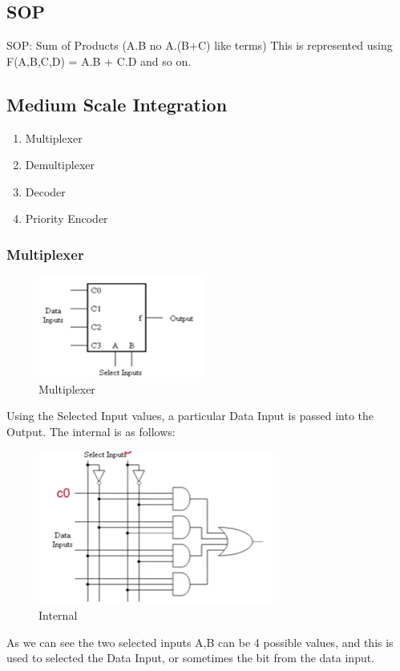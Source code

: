 \documentclass[11pt, a4paper]{article}
\begin{document}
\subsection{SOP}
SOP: Sum of Products (A.B no A.(B+C) like terms)
This is represented using F(A,B,C,D) = A.B + C.D and so on.

\subsection{Medium Scale Integration}
\begin{enumerate}
    \item Multiplexer
    \item Demultiplexer
    \item Decoder
    \item Priority Encoder
\end{enumerate}

\subsubsection{Multiplexer}
\begin{figure}
    \centering
    \includegraphics{Pictures/Multiplexer.png}
    \caption{Multiplexer}
\end{figure}
Using the Selected Input values, a particular Data Input is passed into the Output.
The internal is as follows:
\begin{figure}[H]
    \centering
    \includegraphics{Pictures/MultiplexerInternal.png}
    \caption{Internal}
\end{figure}

As we can see the two selected inputs A,B can be 4 possible values, and this is used to selected the Data Input, or sometimes the bit from the data input.
\end{document}
